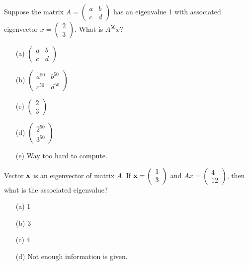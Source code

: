 \begin{problem}
    Suppose the matrix $A = \left( \begin{array}{cc} a & b \\ c & d \end{array} \right) $
    has an eigenvalue 1 with associated eigenvector $x = \left( \begin{array}{c} 2 \\ 3
    \end{array} \right).$ What is $A^{50}x$?
\begin{enumerate}
    \item[(a)] $\left( \begin{array}{cc}
a & b \\
c & d
\end{array} \right) $ 
\item[(b)] $\left( \begin{array}{cc}
a^{50} & b^{50} \\
c^{50} & d^{50}
\end{array} \right) $ 
\item[(c)] $\left( \begin{array}{c} 2 \\ 3 \end{array} \right)$
\item[(d)] $\left( \begin{array}{c} 2^{50} \\ 3^{50} \end{array} \right)$
\item[(e)] Way too hard to compute.
\end{enumerate}
\end{problem}
%             

\begin{problem}
    Vector ${\bf x}$ is an eigenvector of matrix $A$. If ${\bf x} = \left( \begin{array}{c} 1 \\ 3
    \end{array} \right)$ and $Ax = \left( \begin{array}{c} 4 \\ 12 \end{array}\right)$,
    then what is the associated eigenvalue?
\begin{enumerate}
    \item[(a)] 1
    \item[(b)] 3
    \item[(c)] 4
    \item[(d)] Not enough information is given.
\end{enumerate}
\end{problem}
%             

